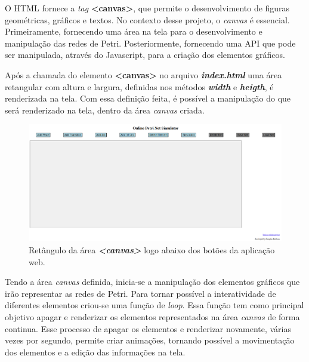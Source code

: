 \documentclass[
	12pt,				%
	openright,			%
	oneside,			%
	a4paper,			%
	english,			%
	brazil				%
	]{abntex2}
\begin{document}
O HTML fornece a \textit{tag} \textbf{<canvas>}, que permite o desenvolvimento de figuras geométricas, gráficos e textos. No contexto desse projeto, o \textit{canvas} é essencial. Primeiramente, fornecendo uma área na tela para o desenvolvimento e manipulação das redes de Petri. Posteriormente, fornecendo uma API que pode ser manipulada, através do Javascript, para a criação dos elementos gráficos. 



Após a chamada do elemento \textbf{<canvas>} no arquivo \textbf{\textit{index.html}} uma área retangular com altura e largura, definidas nos métodos \textbf{\textit{width}} e \textbf{\textit{heigth}}, é renderizada na tela. Com essa definição feita, é possível a manipulação do que será renderizado na tela, dentro da área \textit{canvas} criada. 

\begin{figure}[ht] 
	\centering
	\includegraphics[scale=0.3]{figuras/area_canvas.png}
	\caption[Área canvas]{Retângulo da área \textit{\textbf{<canvas>}} logo abaixo dos botões da aplicação web.}
	\label{fig:area_canvas}
\end{figure}
\FloatBarrier

Tendo a área \textit{canvas} definida, inicia-se a manipulação dos elementos gráficos que irão representar as redes de Petri. Para tornar possível a interatividade de diferentes elementos criou-se uma função de \textit{loop}. Essa função tem como principal objetivo apagar e renderizar os elementos representados na área \textit{canvas} de forma continua. Esse processo de apagar os elementos e renderizar novamente, várias vezes por segundo, permite criar animações, tornando possível a movimentação dos elementos e a edição das informações na tela. 


\end{document}
